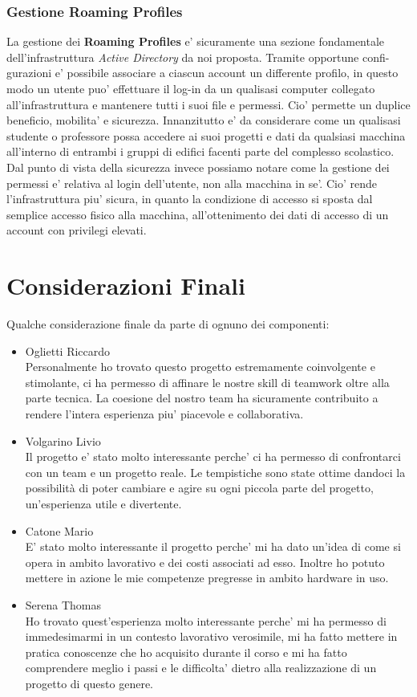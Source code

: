 \documentclass{report}
\begin{document}
			\subsection{Gestione Roaming Profiles}
				La gestione dei \textbf{Roaming Profiles} e' sicuramente una sezione fondamentale dell'infrastruttura
				\emph{Active Directory} da noi proposta. Tramite opportune confi-\\gurazioni e' possibile associare 
				a ciascun account un differente profilo, in questo modo un utente puo' effettuare il log-in da un
				qualisasi computer collegato all'infrastruttura e mantenere tutti i suoi file e permessi.
				Cio' permette un duplice beneficio, mobilita' e sicurezza. Innanzitutto e' da considerare come 
				un qualisasi studente o professore possa accedere ai suoi progetti e dati da qualsiasi macchina 
				all'interno di entrambi i gruppi di edifici facenti parte del complesso scolastico. Dal punto 
				di vista della sicurezza invece possiamo notare come la gestione dei permessi e' relativa al
				login dell'utente, non alla macchina in se'. Cio' rende l'infrastruttura piu' sicura, in quanto
				la condizione di accesso si sposta dal semplice accesso fisico alla macchina, all'ottenimento dei
				dati di accesso di un account con privilegi elevati.
	\chapter{Considerazioni Finali}
		Qualche considerazione finale da parte di ognuno dei componenti:
		\begin{itemize}
			\item Oglietti Riccardo\\
				Personalmente ho trovato questo progetto estremamente coinvolgente e stimolante, ci ha permesso di
				 affinare le nostre skill di teamwork oltre alla parte tecnica. La coesione del nostro team ha
				 sicuramente contribuito a rendere l'intera esperienza piu' piacevole e collaborativa.
			\item Volgarino Livio\\
				Il progetto e' stato molto interessante perche' ci ha permesso di confrontarci con un team e un progetto
				 reale. Le tempistiche sono state ottime dandoci la possibilità di poter cambiare e agire su ogni piccola
				 parte del progetto, un'esperienza utile e divertente. 
			\item Catone Mario\\
				E' stato molto interessante il progetto perche' mi ha dato un'idea di come si opera in ambito lavorativo
				 e dei costi associati ad esso. Inoltre ho potuto mettere in azione le mie competenze pregresse in
				 ambito hardware in uso.
			\item Serena Thomas\\
				Ho trovato quest'esperienza molto interessante perche' mi ha permesso di immedesimarmi in un contesto
				 lavorativo verosimile, mi ha fatto mettere in pratica conoscenze che ho acquisito durante il corso e
				 mi ha fatto comprendere meglio i passi e le difficolta' dietro alla realizzazione di un progetto di
				 questo genere.
		\end{itemize}
\end{document}

